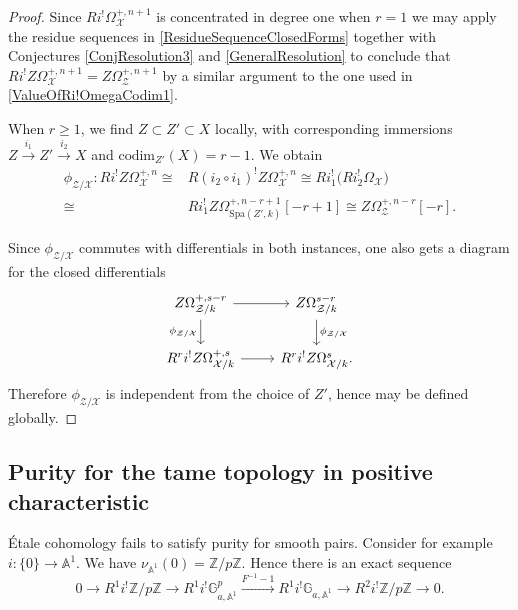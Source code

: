 \documentclass{amsart}
\def\Spa{\textrm{Spa}}
\theoremstyle{definition}
\newcommand{\mX}{\mathcal{X}}
\newcommand{\mZ}{\mathcal{Z}}
\numberwithin{equation}{section}
\begin{document}
\begin{proof}
	Since $Ri^!\Omega^{+,n+1}_{\mathcal{X}}$ is concentrated in degree one when $r=1$ we may apply the residue sequences  in \cref{ResidueSequenceClosedForms} together with Conjectures \ref{ConjResolution3} and \ref{GeneralResolution} to conclude that $Ri^!Z\Omega^{+,n+1}_{\mathcal{X}}=Z\Omega^{+,n+1}_{\mathcal{Z}}$ by a similar argument to the one used in \cref{ValueOfRi!OmegaCodim1}.
	
	When \underline{$r\geq 1$}, we find $Z\subset Z'\subset X$ locally,  with corresponding immersions $Z\xrightarrow{i_1} Z' \xrightarrow{i_2} X$ and $\textrm{codim}_{Z'}(X)=r-1$. We obtain
	\[
	\begin{split}
	 \phi_{\mZ/\mX}:	Ri^!Z\Omega^{+,n}_{\mathcal{X}}\cong & R(i_2 \circ i_1)^!Z\Omega^{+,n}_{\mathcal{X}}\cong  Ri_1^! \big(Ri_2^! \Omega_{\mathcal{X}}\big) \\ \cong & Ri_1^! Z\Omega^{+,n-r+1}_{\Spa(Z',k)}[-r+1]\cong Z\Omega^{+,n-r}_{\mathcal{Z}}[-r]. 
	\end{split}
	\]

Since $\phi_{\mathcal{Z}/\mathcal{X}}$ commutes with differentials in both instances, one also gets a diagram for the closed differentials
	\begin{equation}\label{DiagramOfPhisZ}
	\begin{tikzcd}
		Z\Omega_{\mathcal{Z}/k}^{+,s-r}\ar[r]\ar[d,swap,"\phi_{\mathcal{Z}/\mathcal{X}}"]&Z\Omega_{\mathcal{Z}/k}^{s-r}\ar[d,"\phi_{\mathcal{Z}/\mathcal{X}}"]\\ 
		R^ri^!Z\Omega_{\mathcal{X}/k}^{+,s}\ar[r]& R^ri^!Z\Omega_{\mathcal{X}/k}^s.
	\end{tikzcd}
\end{equation}
Therefore $\phi_{\mZ/\mX}$ is independent from the choice of $Z'$, hence may be defined globally.
\end{proof}

\subsection{Purity for the tame topology in positive characteristic}
\'Etale cohomology fails to satisfy purity for smooth pairs. Consider for example $i:\{0\}\to \mathbb{A}^1$. We have $\nu_{\mathbb{A}^1}(0)=\mathbb{Z}/p\mathbb{Z}$. Hence there is an exact sequence
\[
0 \to R^1 i^{!} \mathbb{Z}/p\mathbb{Z}\to R^1i^{!} \mathbb{G}^p_{a,\mathbb{A}^1}\xrightarrow{F^{-1}-1} R^1i^{!} \mathbb{G}_{a,\mathbb{A}^1}\to R^2i^{!} \mathbb{Z}/p\mathbb{Z}\to 0.
\]
\end{document}
